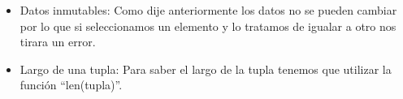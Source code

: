 \begin{itemize}
    \item Datos inmutables: Como dije anteriormente los datos no se pueden cambiar por lo que si seleccionamos un elemento y lo tratamos de igualar a otro nos tirara un error.
    \begin{figure}[h]
        \centering
      \end{figure}
    
    \item Largo de una tupla: Para saber el largo de la tupla tenemos que utilizar la función ``len(tupla)''.
    \begin{figure}[h]
        \centering
      \end{figure}
    

\end{itemize}

